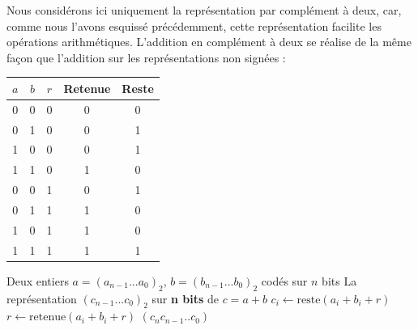 Nous considérons ici uniquement la représentation par complément à deux, car, comme nous l'avons esquissé précédemment, cette représentation facilite les opérations arithmétiques. L'addition en complément à deux se réalise de la même façon que l'addition sur les représentations non signées :

\begin{tabular}{ccc|cc}
$a$ & $b$ & $r$& Retenue & Reste\\
\hline
0 & 0 & 0 & 0 & 0\\
0 & 1 & 0 & 0 & 1\\
1 & 0 & 0 & 0 & 1\\
1 & 1 & 0 & 1 & 0\\
0 & 0 & 1 & 0 & 1\\
0 & 1 & 1 & 1 & 0\\
1 & 0 & 1 & 1 & 0\\
1 & 1 & 1 & 1 & 1
\end{tabular}

\begin{algorithm}
\caption{ \label{algo:addition_binaire_2complement}}
\begin{algorithmic}[1]

\Require Deux entiers $a = (a_{n-1}...a_0)_2$, $b=(b_{n-1}...b_0)_2$ codés sur $n$ bits
\Ensure La représentation $(c_{n-1} ... c_0)_2$ sur \textbf{n bits} de $c = a + b$
\State $c_i \gets \text{reste}(a_i + b_i + r)$
\State $r \gets \text{retenue}(a_i + b_i + r)$
\EndFor
\State \Return $(c_n c_{n-1} .. c_ 0)$
\EndFunction
\end{algorithmic}
\end{algorithm}




